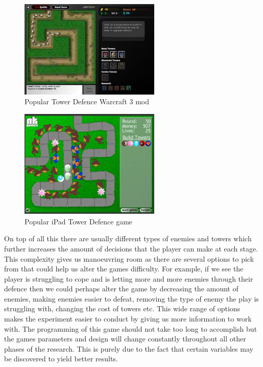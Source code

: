 \documentclass[11pt]{article}
\begin{document}
\begin{figure}[h!]
    \centering
    \includegraphics[width=0.6\textwidth]{td1.jpg}
    \caption{Popular Tower Defence Warcraft 3 mod}
\end{figure}
    \vspace{1.0 mm}
\begin{figure}[h!]
    \centering
    \includegraphics[width=0.6\textwidth]{td2.jpg}
    \caption{Popular iPad Tower Defence game}
\end{figure}

\vspace{3.0 mm}

On top of all this there are usually different types of enemies and towers which further increases the amount of decisions that the player can make at each stage. This complexity gives us manoeuvring room as there are several options to pick from that could help us alter the games difficulty. For example, if we see the player is struggling to cope and is letting more and more enemies through their defence then we could perhaps alter the game by decreasing the amount of enemies, making enemies easier to defeat, removing the type of enemy the play is struggling with, changing the cost of towers etc. This wide range of options makes the experiment easier to conduct by giving us more information to work with. The programming of this game should not take too long to accomplish but the games parameters and design will change constantly throughout all other phases of the research. This is purely due to the fact that certain variables may be discovered to yield better results.
\vspace{3.0 mm}
\end{document}
